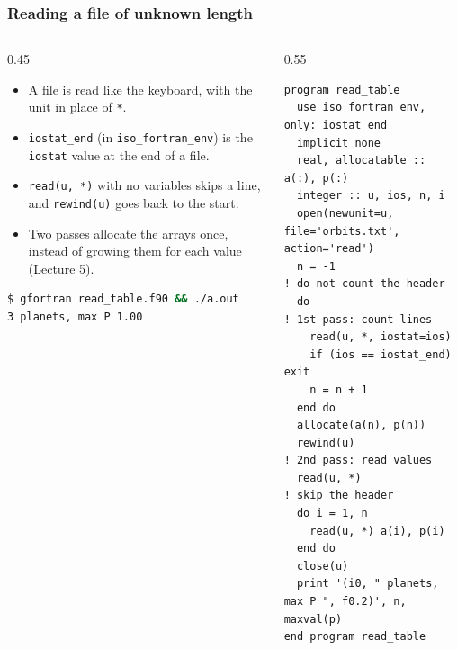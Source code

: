 \begin{frame}[fragile]
  \frametitle{Reading a file of unknown length}
  \begin{columns}[T]
    \begin{column}{0.45\textwidth}
      \begin{itemize}
        \item A file is read like the keyboard, with the unit in place of \texttt{*}.
        \item \texttt{iostat\_end} (in \texttt{iso\_fortran\_env}) is the \texttt{iostat} value at the end of a file.
        \item \texttt{read(u, *)} with no variables skips a line, and \texttt{rewind(u)} goes back to the start.
        \item Two passes allocate the arrays once, instead of growing them for each value (Lecture 5).
      \end{itemize}
      \begin{lstlisting}[language=bash]
$ gfortran read_table.f90 && ./a.out
3 planets, max P 1.00
      \end{lstlisting}
    \end{column}

    \begin{column}{0.55\textwidth}
      \begin{lstlisting}[aboveskip=0pt, belowskip=0pt]
program read_table
  use iso_fortran_env, only: iostat_end
  implicit none
  real, allocatable :: a(:), p(:)
  integer :: u, ios, n, i
  open(newunit=u, file='orbits.txt', action='read')
  n = -1                     ! do not count the header
  do                         ! 1st pass: count lines
    read(u, *, iostat=ios)
    if (ios == iostat_end) exit
    n = n + 1
  end do
  allocate(a(n), p(n))
  rewind(u)                  ! 2nd pass: read values
  read(u, *)                 ! skip the header
  do i = 1, n
    read(u, *) a(i), p(i)
  end do
  close(u)
  print '(i0, " planets, max P ", f0.2)', n, maxval(p)
end program read_table
      \end{lstlisting}
    \end{column}
  \end{columns}
\end{frame}


